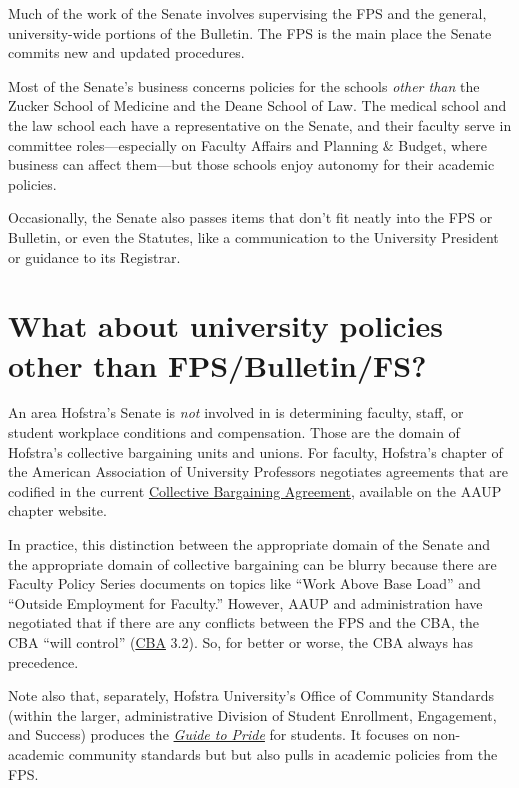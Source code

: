 \documentclass[12pt]{article}
\begin{document}
Much of the work of the Senate involves supervising the FPS and the
general, university-wide portions of the Bulletin. The FPS is the main
place the Senate commits new and updated procedures.

Most of the Senate's business concerns policies for the schools
\emph{other than} the Zucker School of Medicine and the Deane School of
Law. The medical school and the law school each have a representative on
the Senate, and their faculty serve in committee roles---especially on
Faculty Affairs and Planning \& Budget, where business can affect
them---but those schools enjoy autonomy for their academic policies.

Occasionally, the Senate also passes items that don't fit neatly into
the FPS or Bulletin, or even the Statutes, like a communication to the
University President or guidance to its Registrar.

\section{What about university policies other than
FPS/Bulletin/FS?}\label{what-about-university-policies-other-than-fpsbulletinfs}

An area Hofstra's Senate is \emph{not} involved in is determining
faculty, staff, or student workplace conditions and compensation. Those
are the domain of Hofstra's collective bargaining units and unions. For
faculty, Hofstra's chapter of the American Association of University
Professors negotiates agreements that are codified in the current
\href{https://aaup-hofstra.org}{Collective Bargaining Agreement},
available on the AAUP chapter website.

In practice, this distinction between the appropriate domain of the
Senate and the appropriate domain of collective bargaining can be blurry
because there are Faculty Policy Series documents on topics like ``Work
Above Base Load'' and ``Outside Employment for Faculty.'' However, AAUP
and administration have negotiated that if there are any conflicts
between the FPS and the CBA, the CBA ``will control''
(\href{https://aaup-hofstra.org}{CBA} 3.2). So, for better or worse, the
CBA always has precedence.

Note also that, separately, Hofstra University's Office of Community
Standards (within the larger, administrative Division of Student
Enrollment, Engagement, and Success) produces the
\href{https://sites.google.com/hofstra.edu/guide-to-pride/home}{\emph{Guide
to Pride}} for students. It focuses on non-academic community standards
but but also pulls in academic policies from the FPS.
\end{document}
